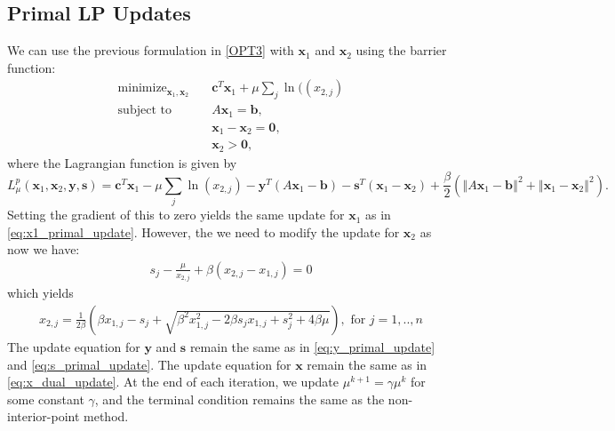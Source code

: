 \documentclass{article}
\begin{document}
\subsection*{Primal LP Updates}
We can use the previous formulation in \eqref{OPT3} with  $\mathbf{x}_{1}$ and $\mathbf{x}_{2}$ using the barrier function:
\begin{align}
\text{minimize}_{ \mathbf{x}_{1}, \mathbf{x}_{2}} &\quad \mathbf{c}^T\mathbf{x}_1 + \mu \sum_j \ln(({x}_{2,j} )\tag{OPT5}\label{OPT5} \\
\text{subject to  \ \  } &\quad  A \mathbf{x}_{1} = \mathbf{b},  \nonumber \\
&\quad \mathbf{x}_{1}  - \mathbf{x}_{2} = \mathbf{0}, \nonumber \\
&\quad \mathbf{x}_{2} > \mathbf{0}, \nonumber 
\end{align}
where the Lagrangian function is given by
\[
L_{\mu}^{p}(\mathbf{x}_{1},\mathbf{x}_{2},\mathbf{y}, \mathbf{s})=\mathbf{c}^{T}\mathbf{x}_{1}-\mu\sum_{j}\ln\left(x_{2,j}\right)-\mathbf{y}^{T}\left(A\mathbf{x}_{1}-\mathbf{b}\right)-\mathbf{s}^{T}\left(\mathbf{x}_{1}-\mathbf{x}_{2}\right)+\frac{\beta}{2}\left(\left\Vert A\mathbf{x}_{1}-\mathbf{b}\right\Vert ^{2}+\left\Vert \mathbf{x}_{1}-\mathbf{x}_{2}\right\Vert ^{2}\right).
\]
Setting the gradient of this to zero yields the same update for $\mathbf{x}_1$ as in \eqref{eq:x1_primal_update}.
However, the we need to modify the update for $\mathbf{x}_2$ as now we have:
\begin{align}
s_j - \frac{\mu}{x_{2,j}} + \beta(x_{2,j} - x_{1,j}) = 0
\end{align}
which yields 
\begin{align}
x_{2,j} = \frac{1}{2\beta}\left(\beta x_{1,j} - s_j  + \sqrt{\beta^2 x_{1,j}^2 - 2\beta s_j x_{1,j} + s_j^2 + 4\beta\mu } \right), \text{ for $j = 1,..,n$}
\end{align}
The update equation for $\mathbf{y}$ and $\mathbf{s}$ remain the same as in \eqref{eq:y_primal_update} and \eqref{eq:s_primal_update}. 
The update equation for $\mathbf{x}$ remain the same as in \eqref{eq:x_dual_update}. At the end of each iteration, we update $\mu^{k+1} = \gamma \mu^k$ for some constant $\gamma$, and the terminal condition remains the same as the non-interior-point method. 

\vspace{0.1in}
\end{document}
